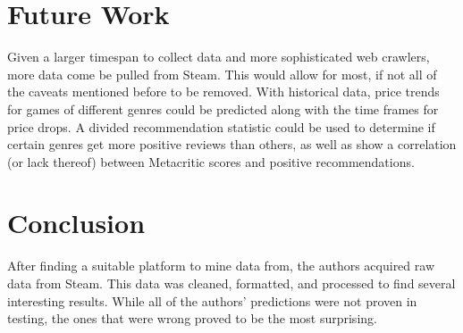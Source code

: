 \documentclass[letterpaper,10pt,twocolumn]{article}
\begin{document}

\section{Future Work}

Given a larger timespan to collect data and more sophisticated web crawlers,
more data come be pulled from Steam.  This would allow for most, if not all of
the caveats mentioned before to be removed.  With historical data, price
trends for games of different genres could be predicted along with the time
frames for price drops.  A divided recommendation statistic could be used to
determine if certain genres get more positive reviews than others, as well as
show a correlation (or lack thereof) between Metacritic scores and positive
recommendations.


\section{Conclusion}

After finding a suitable platform to mine data from, the authors acquired raw
data from Steam.  This data was cleaned, formatted, and processed to find
several interesting results.  While all of the authors' predictions were not
proven in testing, the ones that were wrong proved to be the most surprising.



\nocite{*}                                 %
\printbibliography

\end{document}
